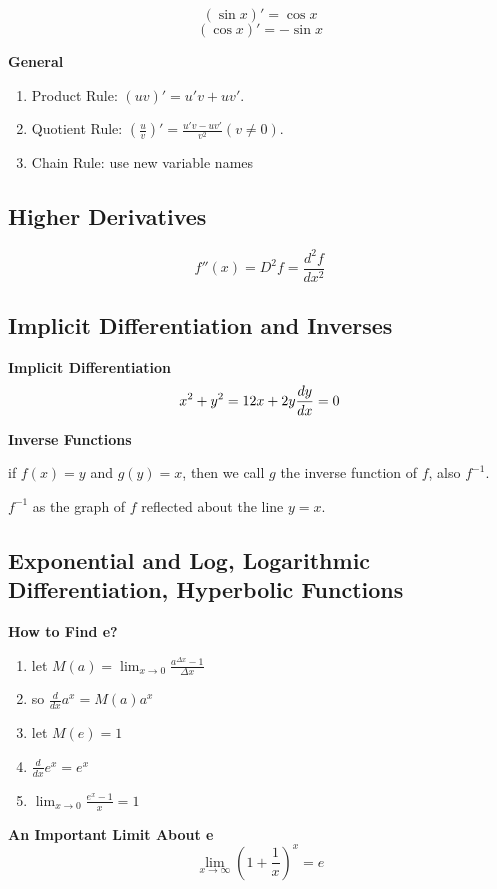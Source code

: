 \documentclass{article}
\newcommand\limitx[1]{\lim_{x \to #1}}
\begin{document}
$$(\sin x)' = \cos x$$
$$(\cos x)' = -\sin x$$

\textbf{General}

\begin{enumerate}
\item Product Rule: $(uv)' = u'v + uv'$.
\item Quotient Rule: $(\frac{u}{v})' = \frac{u'v-uv'}{v^2}(v \not= 0)$.
\item Chain Rule: use new variable names
\end{enumerate}

\subsection{Higher Derivatives}
$$f''(x) = D^2f = \frac{d^2f}{dx^2}$$

\subsection{Implicit Differentiation and Inverses}

\textbf{Implicit Differentiation}
\begin{equation*}
x^2 + y^2 = 1 \\
2x + 2y\frac{dy}{dx} = 0
\end{equation*}

\textbf{Inverse Functions}

if $f(x) = y$ and $g(y) = x$, then we call $g$ the inverse function of $f$, also $f^{-1}$.

$f^{-1}$ as the graph of $f$ reflected about the line $y = x$.

\subsection{Exponential and Log, Logarithmic Differentiation, Hyperbolic Functions}
\textbf{How to Find e?}
\begin{enumerate}
  \item let $M(a) = \limitx{0}\frac{a^{\Delta x} - 1}{\Delta x}$
  \item so $\frac{d}{dx}a^x = M(a)a^x$
  \item let $M(e) = 1$
  \item $\frac{d}{dx}e^x = e^x$
  \item $\limitx{0}\frac{e^x - 1}{x} = 1$
\end{enumerate}

\textbf{An Important Limit About e}
$$\limitx{\infty}(1 + \frac{1}{x})^x = e$$
\end{document}
